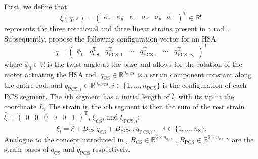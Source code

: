 First, we define that 
\begin{equation}
    \xi(q,s) = \begin{pmatrix} \kappa_x & \kappa_y & \kappa_z & \sigma_x & \sigma_y & \sigma_z \end{pmatrix}^\mathrm{T} \in \mathbb{R}^6
\end{equation}
represents the three rotational and three linear strains present in a rod~\cite{renda2018discrete}. Subsequently, propose the following configuration vector for an \gls{HSA}
\begin{equation}
    q = \begin{pmatrix}
        \phi_0 & q_\mathrm{CS}^\mathrm{T} & q_{\mathrm{PCS},1}^\mathrm{T} & \cdots & q_{\mathrm{PCS},i}^\mathrm{T} & \cdots & q_{\mathrm{PCS},n_\mathrm{S}}^\mathrm{T}
    \end{pmatrix}^\mathrm{T}%
\end{equation}
where $\phi_0 \in \mathbb{R}$ is the twist angle at the base and allows for the rotation of the motor actuating the \gls{HSA} rod. $q_\mathrm{CS} \in \mathbb{R}^{n_{q,\mathrm{CS}}}$ is a strain component constant along the entire rod, and $q_{\mathrm{PCS},i} \in \mathbb{R}^{n_{q,\mathrm{PCS}}}, i \in \{1, \dots, n_\mathrm{PCS}\}$ is the configuration of each \gls{PCS} segment. The $i$th segment has a initial length of $\bar{l}_i$ with its tip at the coordinate $\bar{L}_i$
%
The strain in the $i$th segment is then the sum of the rest strain $\hat{\xi} = \begin{pmatrix} 0 & 0 & 0 & 0 & 0 & 1\end{pmatrix}^\mathrm{T}$, $\xi_\mathrm{CS}$, and $\xi_{\mathrm{PCS},i}$:
\begin{equation}
    \xi_i = \hat{\xi} + B_\mathrm{CS} \: q_\mathrm{CS} + B_{\mathrm{PCS},i} \: q_{\mathrm{PCS},i}, \quad i \in \{1,\dots, n_\mathrm{S}\}.
\end{equation}
Analogue to the concept introduced in \cite{renda2020geometric}, $B_\mathrm{CS} \in \mathbb{R}^{6 \times n_{q,\mathrm{CS}}}$, $B_\mathrm{PCS} \in \mathbb{R}^{6 \times n_{q,\mathrm{PCS}}}$ are the strain bases of $q_\mathrm{CS}$ and $q_\mathrm{PCS}$ respectively.

